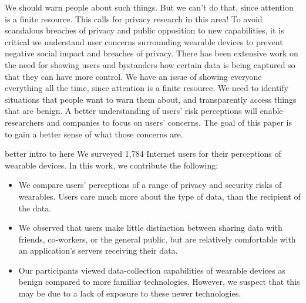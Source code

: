 {\color {red} We should warn people about such things. But we can't do that, since attention is a finite resource. This calls for privacy research in this area!}  To avoid scandalous breaches of privacy and public opposition to new capabilities, it is critical we understand user concerns surrounding wearable devices to prevent negative social impact and breaches of privacy. There has been extensive work on the need for showing users and bystanders how certain data is being captured so that they can have more control. We have an issue of showing everyone everything all the time, since attention is a finite resource. We need to identify situations that people want to warn them about, and transparently access things that are benign. A better understanding of users' risk perceptions will enable researchers and companies to focus on users' concerns. The goal of this paper is to gain a better sense of what those concerns are. 

{\color {red} better intro to here} We surveyed 1,784 Internet users for their perceptions of wearable devices. In this work, we contribute the following: \\[-0.8cm]

\begin{itemize} \itemsep1pt \parskip0pt 
\item We compare users' perceptions of a range of privacy and security risks of wearables. Users care much more about the type of data, than the recipient of the data.
\item We observed that users make little distinction between sharing data with friends, co-workers, or the general public, but are relatively comfortable with an application's servers receiving their data.
\item Our participants viewed data-collection capabilities of wearable devices as benign compared to more familiar technologies. However, we suspect that this may be due to a lack of exposure to these newer technologies.
\end{itemize}